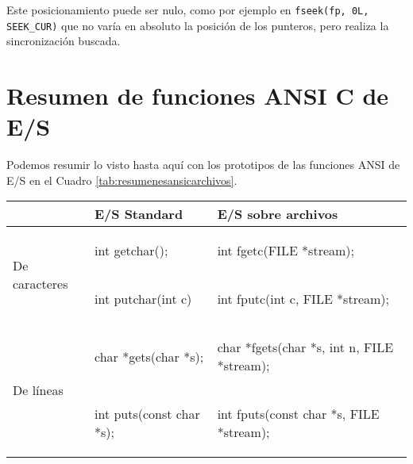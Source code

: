 Este posicionamiento puede ser nulo, como por ejemplo en \lstinline{fseek(fp, 0L, SEEK_CUR)}
que no varía en absoluto la posición de los punteros, pero realiza la
sincronización buscada.

\section{Resumen de funciones ANSI C de E/S}
Podemos resumir lo visto hasta aquí con los prototipos de las funciones ANSI de
E/S en el Cuadro \ref{tab:resumenesansicarchivos}.

\begin{table}[hbtp]
\centering
\begin{tabular}{l|l|l}
	\hline
			& E/S Standard			& E/S sobre archivos \\
    \hline
    \multirow{2}{*}{De caracteres}  & 
\begin{codecell}
int getchar();	
\end{codecell}
& 
\begin{codecell}
int fgetc(FILE *stream); 
\end{codecell}
\\
    								&
\begin{codecell}
int putchar(int c) 
\end{codecell}
& 
\begin{codecell}
int fputc(int c, FILE *stream); 
\end{codecell}
\\
    \hline
    \multirow{2}{*}{De líneas}  & 
\begin{codecell}
char *gets(char *s);
\end{codecell}
	& 
\begin{codecell}
char *fgets(char *s, 
int n, FILE *stream);
\end{codecell}
\\
    								&
\begin{codecell}
int puts(const char *s);
\end{codecell}
  & 
\begin{codecell}
int fputs(const char *s, 
FILE *stream);
\end{codecell}
 \\
    

\end{tabular}
\end{table}
